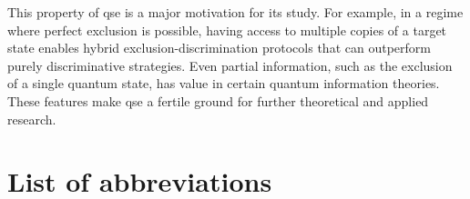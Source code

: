 \documentclass[12pt,letterpaper]{article}
\begin{document}
\begin{multicols}{2}
This property of \gls{qse} is a major motivation for its study. For example, in a regime where perfect exclusion is possible, having access to multiple copies of a target state enables hybrid exclusion-discrimination protocols that can outperform purely discriminative strategies. Even partial information, such as the exclusion of a single quantum state, has value in certain quantum information theories. These features make \gls{qse} a fertile ground for further theoretical and applied research.



 
\section*{List of abbreviations}
\renewcommand{\glsnamefont}[1]{\textbf{#1}}
\printnoidxglossary[type=main, title={\vspace{-1cm}}, nonumberlist, nogroupskip, style=super]


\end{multicols}
\end{document}
